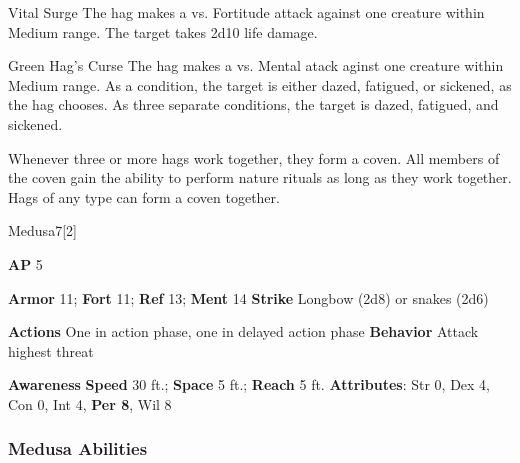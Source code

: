 \begin{ability}{Vital Surge}
The hag makes a  vs. Fortitude attack against one creature within Medium range.
\hit The target takes 2d10 life damage.
\end{ability}

\vspace{0.5em}
\begin{ability}{Green Hag's Curse}
The hag makes a  vs. Mental atack aginst one creature within Medium range.
\hit As a condition, the target is either dazed, fatigued, or sickened, as the hag chooses.
\crit As three separate conditions, the target is dazed, fatigued, and sickened.
\end{ability}

Whenever three or more hags work together, they form a coven.
All members of the coven gain the ability to perform nature rituals as long as they work together.
Hags of any type can form a coven together.





\begin{monsection}{Medusa}{7}[2]
\vspace{-1em}\vspace{-1em}
\begin{spellcontent}
\begin{spelltargetinginfo}
{\textbf{AP} 5}

\pari \textbf{Armor} 11;
\textbf{Fort} 11;
\textbf{Ref} 13;
\textbf{Ment} 14
\pari \textbf{Strike} Longbow  (2d8) or snakes  (2d6)


\pari \textbf{Actions} One in action phase, one in delayed action phase
\pari \textbf{Behavior} Attack highest threat
\end{spelltargetinginfo}
\end{spellcontent}

\begin{monsterfooter}
\pari \textbf{Awareness} 
\pari \textbf{Speed} 30 ft.;
\textbf{Space} 5 ft.;
\textbf{Reach} 5 ft.
\pari \textbf{Attributes}:
Str 0,
Dex 4,
Con 0,
Int 4,
\textbf{Per 8},
Wil 8
\end{monsterfooter}
\end{monsection}


\subsubsection{Medusa Abilities}


